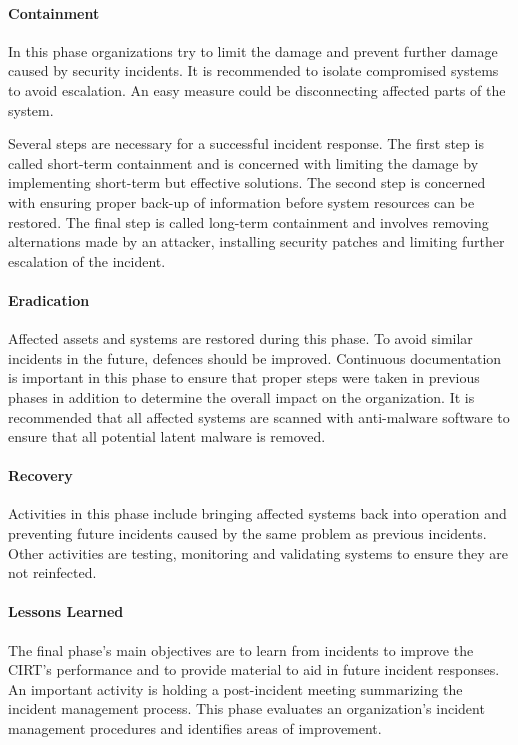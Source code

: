 \paragraph{Containment} 
In this phase organizations try to limit the damage and prevent further damage caused by security incidents. It is recommended to isolate compromised systems to avoid escalation. An easy measure could be disconnecting affected parts of the system. 

Several steps are necessary for a successful incident response. The first step is called short-term containment and is concerned with limiting the damage by implementing short-term but effective solutions. The second step is concerned with ensuring proper back-up of information before system resources can be restored. The final step is called long-term containment and involves removing alternations made by an attacker, installing security patches and limiting further escalation of the incident.

\paragraph{Eradication} 
Affected assets and systems are restored during this phase. To avoid similar incidents in the future, defences should be improved. Continuous documentation is important in this phase to ensure that proper steps were taken in previous phases in addition to determine the overall impact on the organization. It is recommended that all affected systems are scanned with anti-malware software to ensure that all potential latent malware is removed. 

\paragraph{Recovery} 
Activities in this phase include bringing affected systems back into operation and preventing future incidents caused by the same problem as previous incidents. Other activities are testing, monitoring and validating systems to ensure they are not reinfected. 

\paragraph{Lessons Learned} 
The final phase's main objectives are to learn from incidents to improve the CIRT's performance and to provide material to aid in future incident responses. An important activity is holding a post-incident meeting summarizing the incident management process. This phase evaluates an organization's incident management procedures and identifies areas of improvement.